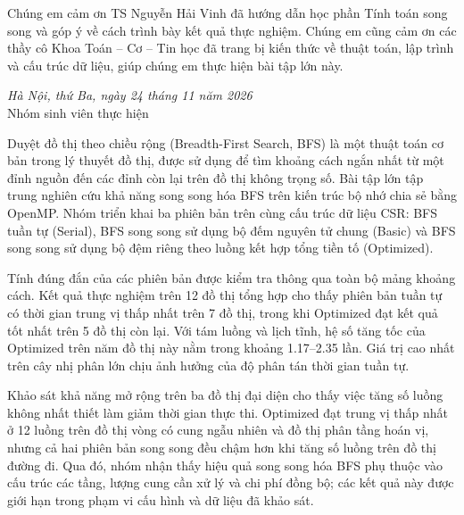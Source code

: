 

\hypersetup{pageanchor=false}

\hypersetup{pageanchor=true}

Chúng em cảm ơn TS Nguyễn Hải Vinh đã hướng dẫn học phần Tính toán song song và góp ý về cách trình bày kết quả thực nghiệm. Chúng em cũng cảm ơn các thầy cô Khoa Toán -- Cơ -- Tin học đã trang bị kiến thức về thuật toán, lập trình và cấu trúc dữ liệu, giúp chúng em thực hiện bài tập lớn này.

\begin{flushright}
\textit{Hà Nội, thứ Ba, ngày 24 tháng 11 năm 2026}\\
Nhóm sinh viên thực hiện
\end{flushright}

Duyệt đồ thị theo chiều rộng (Breadth-First Search, BFS) là một thuật toán cơ bản trong lý thuyết đồ thị, được sử dụng để tìm khoảng cách ngắn nhất từ một đỉnh nguồn đến các đỉnh còn lại trên đồ thị không trọng số. Bài tập lớn tập trung nghiên cứu khả năng song song hóa BFS trên kiến trúc bộ nhớ chia sẻ bằng OpenMP. Nhóm triển khai ba phiên bản trên cùng cấu trúc dữ liệu CSR: BFS tuần tự (Serial), BFS song song sử dụng bộ đếm nguyên tử chung (Basic) và BFS song song sử dụng bộ đệm riêng theo luồng kết hợp tổng tiền tố (Optimized).

Tính đúng đắn của các phiên bản được kiểm tra thông qua toàn bộ mảng khoảng cách. Kết quả thực nghiệm trên 12 đồ thị tổng hợp cho thấy phiên bản tuần tự có thời gian trung vị thấp nhất trên 7 đồ thị, trong khi Optimized đạt kết quả tốt nhất trên 5 đồ thị còn lại. Với tám luồng và lịch tĩnh, hệ số tăng tốc của Optimized trên năm đồ thị này nằm trong khoảng \num{1.17}--\num{2.35} lần. Giá trị cao nhất trên cây nhị phân lớn chịu ảnh hưởng của độ phân tán thời gian tuần tự.

Khảo sát khả năng mở rộng trên ba đồ thị đại diện cho thấy việc tăng số luồng không nhất thiết làm giảm thời gian thực thi. Optimized đạt trung vị thấp nhất ở 12 luồng trên đồ thị vòng có cung ngẫu nhiên và đồ thị phân tầng hoán vị, nhưng cả hai phiên bản song song đều chậm hơn khi tăng số luồng trên đồ thị đường đi. Qua đó, nhóm nhận thấy hiệu quả song song hóa BFS phụ thuộc vào cấu trúc các tầng, lượng cung cần xử lý và chi phí đồng bộ; các kết quả này được giới hạn trong phạm vi cấu hình và dữ liệu đã khảo sát.

\begingroup\fontsize{11}{13}\selectfont\singlespacing\tableofcontents\endgroup
\listmedia

